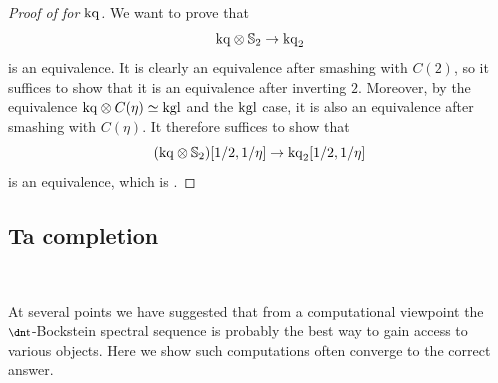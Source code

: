 \begin{proof}[Proof of  for $\mathrm{kq}$]
  We want to prove that
  \[\mathrm{kq} \otimes \operatorname{\mathbb{S}}_2 \to \mathrm{kq}_2\]
  is an equivalence.
  It is clearly an equivalence after smashing with $C(2)$, so it suffices to show that it is an equivalence after inverting $2$.
  Moreover, by the equivalence $\mathrm{kq} \otimes C(\eta) \simeq \mathrm{kgl}$ and the $\mathrm{kgl}$ case, it is also an equivalence after smashing with $C(\eta)$.
  It therefore suffices to show that
  \[(\mathrm{kq} \otimes \operatorname{\mathbb{S}}_2)[1/2, 1/\eta] \to \mathrm{kq}_2 [1/2, 1/\eta]\]
  is an equivalence, which is .
%
%
%
%
%
%
%
\end{proof}



\subsection{Ta completion} \label{sec:ta-comp}\

At several points we have suggested that from a computational viewpoint the $\ta$-Bockstein spectral sequence is probably the best way to gain access to various objects. Here we show such computations often converge to the correct answer.

